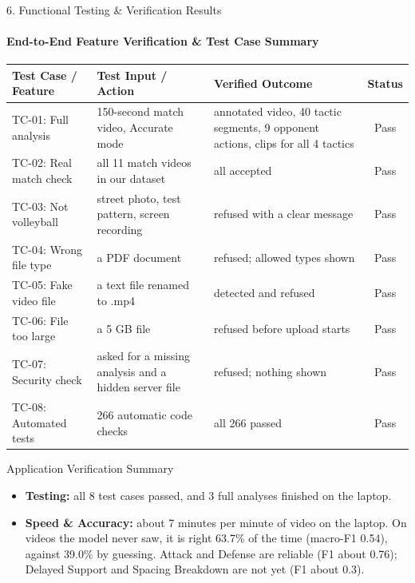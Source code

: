 \documentclass[aspectratio=169, 11pt]{beamer}
\begin{document}
\begin{frame}{6. Functional Testing \& Verification Results}
    \framesubtitle{End-to-End Feature Verification \& Test Case Summary}
\begin{table}
    \centering
    \tiny
    \renewcommand{\arraystretch}{1.15}
    \begin{tabular}{p{3.0cm} p{3.4cm} p{4.4cm} c}
        \toprule
        \textbf{Test Case / Feature} & \textbf{Test Input / Action} & \textbf{Verified Outcome} & \textbf{Status} \\
        \midrule
TC-01: Full analysis & 150-second match video, Accurate mode & annotated video, 40 tactic segments, 9 opponent actions, clips for all 4 tactics & Pass \\
TC-02: Real match check & all 11 match videos in our dataset & all accepted & Pass \\
TC-03: Not volleyball & street photo, test pattern, screen recording & refused with a clear message & Pass \\
TC-04: Wrong file type & a PDF document & refused; allowed types shown & Pass \\
TC-05: Fake video file & a text file renamed to .mp4 & detected and refused & Pass \\
TC-06: File too large & a 5 GB file & refused before upload starts & Pass \\
TC-07: Security check & asked for a missing analysis and a hidden server file & refused; nothing shown & Pass \\
TC-08: Automated tests & 266 automatic code checks & all 266 passed & Pass \\
        \bottomrule
    \end{tabular}
\end{table}
\begin{block}{Application Verification Summary}
\scriptsize
\begin{itemize}
  \item \textbf{Testing:} all 8 test cases passed, and 3 full analyses finished on the laptop.
  \item \textbf{Speed \& Accuracy:} about 7 minutes per minute of video on the laptop. On videos the model never saw, it is right 63.7\% of the time (macro-F1 0.54), against 39.0\% by guessing. Attack and Defense are reliable (F1 about 0.76); Delayed Support and Spacing Breakdown are not yet (F1 about 0.3).
\end{itemize}
\end{block}
\end{frame}
\end{document}

